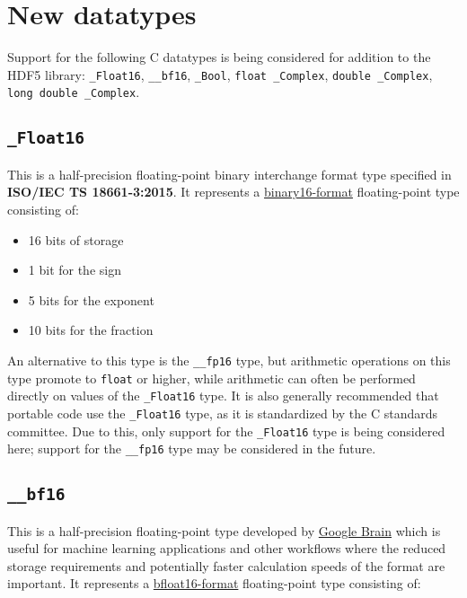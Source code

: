 \documentclass[../HDF5_RFC.tex]{subfiles}
\begin{document}
\section{New datatypes}
\label{new_datatypes}

Support for the following C datatypes is being considered for addition to the HDF5 library:
\texttt{\_Float16}, \texttt{\_\_bf16}, \texttt{\_Bool}, \texttt{float \_Complex}, \texttt{double \_Complex}, \texttt{long double \_Complex}.

\subsection{\texttt{\_Float16}}

This is a half-precision floating-point binary interchange format type specified in \textbf{ISO/IEC TS 18661-3:2015}.
It represents a \href{https://en.wikipedia.org/wiki/Half-precision_floating-point_format}{binary16-format} floating-point
type consisting of:

\begin{itemize}
    \item 16 bits of storage
    \item 1 bit for the sign
    \item 5 bits for the exponent
    \item 10 bits for the fraction
\end{itemize}

An alternative to this type is the \texttt{\_\_fp16} type, but arithmetic operations on this type promote to \texttt{float}
or higher, while arithmetic can often be performed directly on values of the \texttt{\_Float16} type. It is also generally
recommended that portable code use the \texttt{\_Float16} type, as it is standardized by the C standards committee. Due to
this, only support for the \texttt{\_Float16} type is being considered here; support for the \texttt{\_\_fp16} type may be
considered in the future.

\subsection{\texttt{\_\_bf16}}

This is a half-precision floating-point type developed by \href{https://en.wikipedia.org/wiki/Google_Brain}{Google Brain}
which is useful for machine learning applications and other workflows where the reduced storage requirements and potentially
faster calculation speeds of the format are important. It represents a \href{https://en.wikipedia.org/wiki/Bfloat16_floating-point_format}{bfloat16-format}
floating-point type consisting of:
\end{document}
